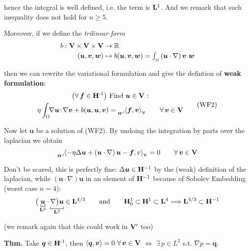 hence the integral is well defined, i.e. the term is $\mathbf{L}^1$. {\color{purple} And we remark that such inequality does not hold for $n\geq 5$.}

\smallskip

Moreover, if we define the \emph{trilinear form}
\begin{align*}
b:\mathbf{V}\times \mathbf{V} \times \mathbf{V} &\to \mathbb{R} \\
(\bm u, \bm v, \bm w) &\mapsto b (\bm u, \bm v, \bm w) = \textstyle\int_{_\Omega} \left( \bm u\cdot\nabla \right) \bm v\ \bm w
\end{align*}

then we can rewrite the variational formulation and give the defintion of \textbf{weak formulation}:
\begin{equation*}
\begin{gathered}
\big(\forall\,\bm f\in\Hv^{\text{-}1}\big)\text{ Find }\bm u\in \Vv\text{ :} \\ 
\eta\int_\Omega\!\! \nabla \bm u\! :\! \nabla \bm v+b(\bm u,\bm u,\bm v)=\dualV{\bm f,\bm v}{\Hv}{-1} \qquad \forall\, \bm v\in\Vv    
\end{gathered}
\tag{WF2}
\end{equation*}

\noindent\rlap{\rule[1.5ex]{0.495\textwidth}{.2pt}}\vspace{-0.5em}

Now let $\bm u$ be a solution of (WF2). By undoing the integration by parts over the laplacian we obtain
\begin{equation}
\label{eq:dual-stop}
\dualV{-\eta\Delta\bm u+ \left( \bm u\cdot\nabla \right)\bm u-\bm f,v}{\Hv}{-1}=0\qquad\forall\, \bm v\in\Vv
\end{equation}

Don't be scared, this is perfectly fine: $\Delta\bm u\in\mathbf{H}^{-1}$ by the (weak) definition of the laplacian, while $\left( \bm u\cdot\nabla \right)\bm u$ in an element of $\mathbf{H}^{-1}$ because of Sobolev Embedding (worst case $n=4$):
\begin{equation*}
\big( \underbracket[0.5pt]{\bm u}_{\Lv^4}\cdot \underbracket[0.5pt]{\nabla \big) \bm u}_{\Lv^2} \in \Lv^{4/3}\qquad\text{and}\qquad \Hv_0^1\subset\Hv^1\subset \Lv^4 \Longrightarrow \Lv^{4/3}\subset \Hv^{-1}
\end{equation*}

{\color{blue}(we remark again that this could work in $\mathbf{V}'$ too)}

\smallskip

\textbf{Thm.} Take $\bm q\in\mathbf{H}^{\text{-}1}$, then $\left\langle \bm q,\bm v \right\rangle=0\ \forall\,\bm v\in\mathbf{V}$ $\Longleftrightarrow$ $\exists\,p\in L^2$ s.t. $\nabla p=\bm q$.


